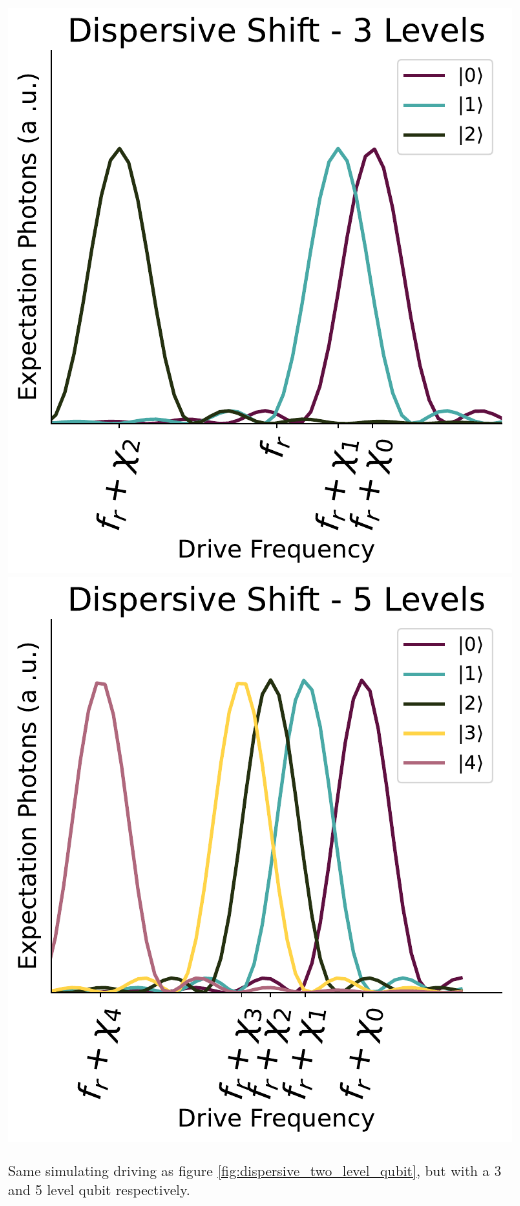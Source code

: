 \begin{marginfigure}
    \centering
    \includegraphics[]{Simulations/readout_simulations/dispersive_shift_3_level.pdf}
    \includegraphics[]{Simulations/readout_simulations/dispersive_shift_5_level.pdf}
    \caption{Same simulating driving as figure \ref{fig:dispersive_two_level_qubit}, but with a 3 and 5 level qubit respectively.}
    \label{fig:dispersive_multi_level}
\end{marginfigure}
